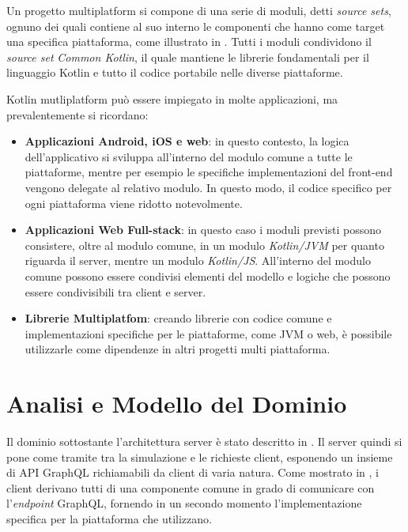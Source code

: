 Un progetto multiplatform si compone di una serie di moduli, detti \textit{source sets}, ognuno dei quali contiene al suo interno le componenti che
hanno come target una specifica piattaforma, come illustrato in . Tutti i moduli condividono il \textit{source set} \textit{Common Kotlin}, il quale mantiene le librerie
fondamentali per il linguaggio Kotlin e tutto il codice portabile nelle diverse piattaforme.


Kotlin mutliplatform può essere impiegato in molte applicazioni, ma prevalentemente si ricordano:
\begin{itemize}
    \item \textbf{Applicazioni Android, iOS e web}: in questo contesto, la logica dell'applicativo si sviluppa all'interno del modulo comune a tutte
        le piattaforme, mentre per esempio le specifiche implementazioni del front-end vengono delegate al relativo modulo. In questo modo, il codice
        specifico per ogni piattaforma viene ridotto notevolmente.
    \item \textbf{Applicazioni Web Full-stack}: in questo caso i moduli previsti possono consistere, oltre al modulo comune, in un modulo \textit{Kotlin/JVM}
        per quanto riguarda il server, mentre un modulo \textit{Kotlin/JS}. All'interno del modulo comune possono essere condivisi elementi del modello e
        logiche che possono essere condivisibili tra client e server.
    \item \textbf{Librerie Multiplatfom}: creando librerie con codice comune e implementazioni specifiche per le piattaforme, come JVM o web, è possibile
        utilizzarle come dipendenze in altri progetti multi piattaforma.
\end{itemize}

\section{Analisi e Modello del Dominio}\label{sec:domain-model}
Il dominio sottostante l'architettura server è stato descritto in . Il server quindi si pone come tramite tra la simulazione e le 
richieste client, esponendo un insieme di API GraphQL richiamabili da client di varia natura. Come mostrato in , i client derivano
tutti di una componente comune in grado di comunicare con l'\textit{endpoint} GraphQL, fornendo in un secondo momento l'implementazione specifica per
la piattaforma che utilizzano.

